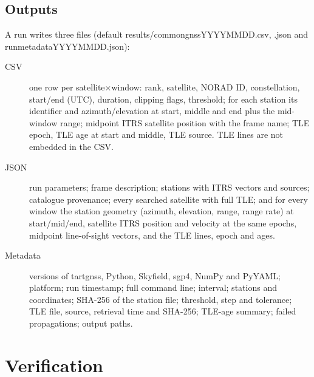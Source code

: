 \documentclass[11pt,a4paper]{article}
\newcommand{\code}[1]{{\ttfamily\def\_{\textunderscore\allowbreak}#1}}
\begin{document}
\subsection{Outputs}

A run writes three files (default \code{results/\allowbreak common\_gnss\_YYYYMMDD.csv},
\code{.json} and \code{run\_metadata\_YYYYMMDD.json}):
\begin{description}
\item[CSV] one row per satellite$\times$window: rank, satellite, NORAD ID,
constellation, start/end (UTC), duration, clipping flags, threshold; for each
station its identifier and azimuth/elevation at start, middle and end plus
the mid-window range; midpoint ITRS satellite position with the frame name;
TLE epoch, TLE age at start and middle, TLE source. TLE lines are not
embedded in the CSV.
\item[JSON] run parameters; frame description; stations with ITRS vectors
and sources; catalogue provenance; every searched satellite with full TLE;
and for every window the station geometry (azimuth, elevation, range, range
rate) at start/mid/end, satellite ITRS position and velocity at the same
epochs, midpoint line-of-sight vectors, and the TLE lines, epoch and ages.
\item[Metadata] versions of \code{tart\_gnss}, Python, Skyfield, sgp4, NumPy
and PyYAML; platform; run timestamp; full command line; interval;
stations and coordinates; SHA-256 of the station file; threshold, step and
tolerance; TLE file, source, retrieval time and SHA-256; TLE-age summary;
failed propagations; output paths.
\end{description}

\section{Verification}
\label{sec:verification}
\end{document}
